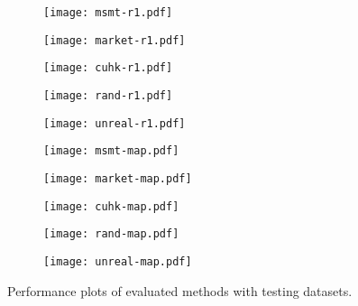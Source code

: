 \documentclass[10pt,twocolumn,letterpaper]{article}
\begin{document}
\begin{figure*}
\centering
  \begin{subfigure}[b]{0.19\textwidth}
  \texttt{[image: msmt-r1.pdf]}
  \caption{}\label{fig:msmt-r1}
  \end{subfigure}
  \begin{subfigure}[b]{0.184\textwidth}
  \texttt{[image: market-r1.pdf]}
  \caption{}\label{fig:mart-r1}
  \end{subfigure}
  \begin{subfigure}[b]{0.1855\textwidth}
  \texttt{[image: cuhk-r1.pdf]}
  \caption{}\label{fig:cuhk-r1}
  \end{subfigure}
  \begin{subfigure}[b]{0.203\textwidth}
  \texttt{[image: rand-r1.pdf]}
  \caption{}\label{fig:rand-r1}
  \end{subfigure}
  \begin{subfigure}[b]{0.205\textwidth}
  \texttt{[image: unreal-r1.pdf]}
  \caption{}\label{fig:unreal-r1}
  \end{subfigure}
  \begin{subfigure}[b]{0.19\textwidth}
  \texttt{[image: msmt-map.pdf]}
  \caption{}\label{fig:msmt-map}
  \end{subfigure}
  \begin{subfigure}[b]{0.184\textwidth}
  \texttt{[image: market-map.pdf]}
  \caption{}\label{fig:mart-map}
  \end{subfigure}
  \begin{subfigure}[b]{0.184\textwidth}
  \texttt{[image: cuhk-map.pdf]}
  \caption{}\label{fig:cuhk-map}
  \end{subfigure}
  \begin{subfigure}[b]{0.2032\textwidth}
  \texttt{[image: rand-map.pdf]}
  \caption{}\label{fig:rand-map}
  \end{subfigure}
  \begin{subfigure}[b]{0.203\textwidth}
  \texttt{[image: unreal-map.pdf]}
  \caption{}\label{fig:unreal-map}
  \end{subfigure} 
\caption{Performance plots of evaluated methods with testing datasets.}
\label{fig:long}
\end{figure*}
\end{document}
